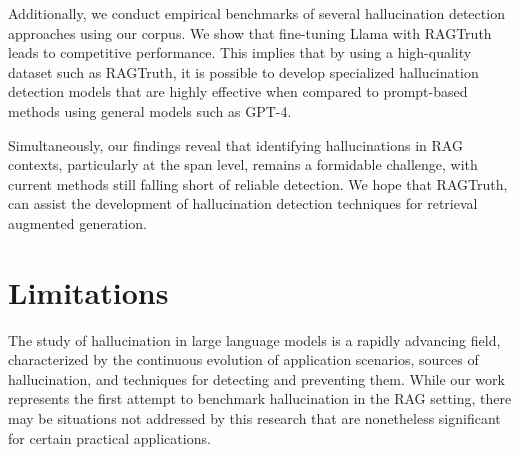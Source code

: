 \documentclass[11pt]{article}
\newcommand{\CorpusName}{RAGTruth}
\begin{document}
Additionally, we conduct empirical benchmarks of several hallucination detection approaches using our corpus. We show that fine-tuning Llama with {\CorpusName} leads to competitive performance. This implies that by using a high-quality dataset such as {\CorpusName}, it is possible to develop specialized hallucination detection models that are highly effective when compared to prompt-based methods using general models such as GPT-4. 

Simultaneously, our findings reveal that identifying hallucinations in RAG contexts, particularly at the span level, remains a formidable challenge, with current methods still falling short of reliable detection. 
We hope that {\CorpusName}, 
can assist the development of hallucination detection techniques for retrieval augmented generation. 


\section{Limitations}

The study of hallucination in large language models is a rapidly advancing field, characterized by the continuous evolution of application scenarios, sources of hallucination, and techniques for detecting and preventing them. While our work represents the first attempt to benchmark hallucination in the RAG setting, there may be situations not addressed by this research that are nonetheless significant for certain practical applications.
\end{document}
